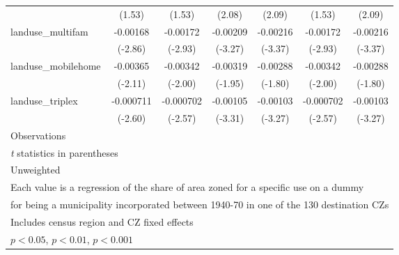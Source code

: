 \begin{table}[htbp]
\begin{tabular}{l*{6}{c}}
                    &      (1.53)         &      (1.53)         &      (2.08)         &      (2.09)         &      (1.53)         &      (2.09)         \\
\addlinespace
landuse\_multifam    &    -0.00168\sym{**} &    -0.00172\sym{**} &    -0.00209\sym{**} &    -0.00216\sym{***}&    -0.00172\sym{**} &    -0.00216\sym{***}\\
                    &     (-2.86)         &     (-2.93)         &     (-3.27)         &     (-3.37)         &     (-2.93)         &     (-3.37)         \\
\addlinespace
landuse\_mobilehome  &    -0.00365\sym{*}  &    -0.00342\sym{*}  &    -0.00319         &    -0.00288         &    -0.00342\sym{*}  &    -0.00288         \\
                    &     (-2.11)         &     (-2.00)         &     (-1.95)         &     (-1.80)         &     (-2.00)         &     (-1.80)         \\
\addlinespace
landuse\_triplex     &   -0.000711\sym{**} &   -0.000702\sym{*}  &    -0.00105\sym{***}&    -0.00103\sym{**} &   -0.000702\sym{*}  &    -0.00103\sym{**} \\
                    &     (-2.60)         &     (-2.57)         &     (-3.31)         &     (-3.27)         &     (-2.57)         &     (-3.27)         \\
\midrule
Observations        &                     &                     &                     &                     &                     &                     \\
\bottomrule
\multicolumn{7}{l}{\footnotesize \textit{t} statistics in parentheses}\\
\multicolumn{7}{l}{\footnotesize Unweighted}\\
\multicolumn{7}{l}{\footnotesize Each value is a regression of the share of area zoned for a specific use on a dummy}\\
\multicolumn{7}{l}{\footnotesize for being a municipality incorporated between 1940-70 in one of the 130 destination CZs}\\
\multicolumn{7}{l}{\footnotesize Includes census region and CZ fixed effects}\\
\multicolumn{7}{l}{\footnotesize \sym{*} \(p<0.05\), \sym{**} \(p<0.01\), \sym{***} \(p<0.001\)}\\
\end{tabular}
\end{table}
